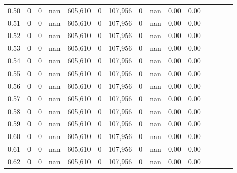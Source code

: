 \begin{tabular}{rrrcrrrrrrrrrrr}
0.50 &       0 &      0 &                                        nan &  605,610 &        0 &  107,956 &        0 &   nan &  0.00 &                         0.00 \\
0.51 &       0 &      0 &                                        nan &  605,610 &        0 &  107,956 &        0 &   nan &  0.00 &                         0.00 \\
0.52 &       0 &      0 &                                        nan &  605,610 &        0 &  107,956 &        0 &   nan &  0.00 &                         0.00 \\
0.53 &       0 &      0 &                                        nan &  605,610 &        0 &  107,956 &        0 &   nan &  0.00 &                         0.00 \\
0.54 &       0 &      0 &                                        nan &  605,610 &        0 &  107,956 &        0 &   nan &  0.00 &                         0.00 \\
0.55 &       0 &      0 &                                        nan &  605,610 &        0 &  107,956 &        0 &   nan &  0.00 &                         0.00 \\
0.56 &       0 &      0 &                                        nan &  605,610 &        0 &  107,956 &        0 &   nan &  0.00 &                         0.00 \\
0.57 &       0 &      0 &                                        nan &  605,610 &        0 &  107,956 &        0 &   nan &  0.00 &                         0.00 \\
0.58 &       0 &      0 &                                        nan &  605,610 &        0 &  107,956 &        0 &   nan &  0.00 &                         0.00 \\
0.59 &       0 &      0 &                                        nan &  605,610 &        0 &  107,956 &        0 &   nan &  0.00 &                         0.00 \\
0.60 &       0 &      0 &                                        nan &  605,610 &        0 &  107,956 &        0 &   nan &  0.00 &                         0.00 \\
0.61 &       0 &      0 &                                        nan &  605,610 &        0 &  107,956 &        0 &   nan &  0.00 &                         0.00 \\
0.62 &       0 &      0 &                                        nan &  605,610 &        0 &  107,956 &        0 &   nan &  0.00 &                         0.00 \\

\end{tabular}
